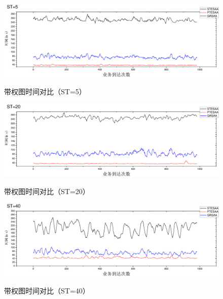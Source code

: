 \begin{figure}
\vspace{-0.5cm}
\setlength{\abovecaptionskip}{-0.5cm}
\begin{center}
{\includegraphics[width=1 \textwidth]{figures/H5T.pdf}}
\end{center}
\caption{{\footnotesize{带权图时间对比（ST=5）}}}
\label{H5T}
\end{figure}
\begin{figure}
\vspace{-0.5cm}
\setlength{\abovecaptionskip}{-0.5cm}
\begin{center}
{\includegraphics[width=1 \textwidth]{figures/H20T.pdf}}
\end{center}
\caption{{\footnotesize{带权图时间对比（ST=20）}}}
\label{H20T}
\end{figure}
\begin{figure}
\vspace{-0.5cm}
\setlength{\abovecaptionskip}{-0.5cm}
\begin{center}
\vspace{-0.05cm}
{\includegraphics[width=1 \textwidth]{figures/H40T.pdf}}
\end{center}
\caption{{\footnotesize{带权图时间对比（ST=40）}}}
\label{H40T}
\end{figure}

